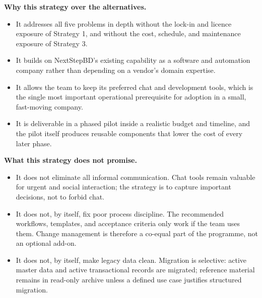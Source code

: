 \documentclass[12pt,a4paper]{report}
\begin{document}
\textbf{Why this strategy over the alternatives.}
\begin{itemize}[leftmargin=1.6em]
    \item It addresses all five problems in depth without the lock-in and licence exposure
          of Strategy 1, and without the cost, schedule, and maintenance exposure of
          Strategy 3.
    \item It builds on NextStepBD's existing capability as a software and automation company
          rather than depending on a vendor's domain expertise.
    \item It allows the team to keep its preferred chat and development tools, which is the
          single most important operational prerequisite for adoption in a small,
          fast-moving company.
    \item It is deliverable in a phased pilot inside a realistic budget and timeline, and the
          pilot itself produces reusable components that lower the cost of every later
          phase.
\end{itemize}

\textbf{What this strategy does not promise.}
\begin{itemize}[leftmargin=1.6em]
    \item It does not eliminate all informal communication. Chat tools remain valuable for
          urgent and social interaction; the strategy is to capture important decisions, not
          to forbid chat.
    \item It does not, by itself, fix poor process discipline. The recommended workflows,
          templates, and acceptance criteria only work if the team uses them. Change
          management is therefore a co-equal part of the programme, not an optional add-on.
    \item It does not, by itself, make legacy data clean. Migration is selective: active
          master data and active transactional records are migrated; reference material
          remains in read-only archive unless a defined use case justifies structured
          migration.
\end{itemize}

%
%
\end{document}
